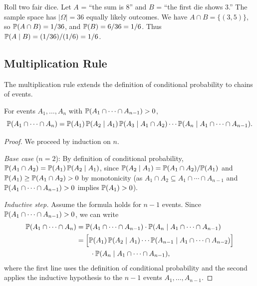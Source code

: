\documentclass[11pt,a4paper]{article}
\begin{document}
\begin{example}
\label{ex:cond_dice}
Roll two fair dice. Let $A$ = ``the sum is 8'' and $B$ = ``the first die
shows 3.'' The sample space has $|\Omega| = 36$ equally likely outcomes.
We have $A \cap B = \{(3, 5)\}$, so $\mathbb{P}(A \cap B) = 1/36$, and
$\mathbb{P}(B) = 6/36 = 1/6$. Thus
$\mathbb{P}(A \mid B) = (1/36)/(1/6) = 1/6$.
\end{example}

\subsection{Multiplication Rule}

The multiplication rule extends the definition of conditional probability
to chains of events.

\begin{theorem}
\label{thm:mult_rule}
For events $A_1, \ldots, A_n$ with
$\mathbb{P}(A_1 \cap \cdots \cap A_{n-1}) > 0$,
\[
    \mathbb{P}(A_1 \cap \cdots \cap A_n)
    = \mathbb{P}(A_1) \, \mathbb{P}(A_2 \mid A_1) \,
    \mathbb{P}(A_3 \mid A_1 \cap A_2) \cdots
    \mathbb{P}(A_n \mid A_1 \cap \cdots \cap A_{n-1}).
\]
\end{theorem}

\begin{proof}
We proceed by induction on $n$.

\emph{Base case} ($n = 2$): By definition of conditional probability,
$\mathbb{P}(A_1 \cap A_2)
= \mathbb{P}(A_1) \, \mathbb{P}(A_2 \mid A_1)$,
since $\mathbb{P}(A_2 \mid A_1) = \mathbb{P}(A_1 \cap A_2)/\mathbb{P}(A_1)$ and
$\mathbb{P}(A_1) \geq \mathbb{P}(A_1 \cap A_2) > 0$ by monotonicity (as
$A_1 \cap A_2 \subseteq A_1 \cap \cdots \cap A_{n-1}$ and
$\mathbb{P}(A_1 \cap \cdots \cap A_{n-1}) > 0$ implies
$\mathbb{P}(A_1) > 0$).

\emph{Inductive step.} Assume the formula holds for $n - 1$ events.
Since $\mathbb{P}(A_1 \cap \cdots \cap A_{n-1}) > 0$, we can write
\begin{align*}
    \mathbb{P}(A_1 \cap \cdots \cap A_n)
    &= \mathbb{P}(A_1 \cap \cdots \cap A_{n-1}) \cdot
       \mathbb{P}(A_n \mid A_1 \cap \cdots \cap A_{n-1}) \\
    &= \Bigl[\mathbb{P}(A_1) \, \mathbb{P}(A_2 \mid A_1) \cdots
       \mathbb{P}(A_{n-1} \mid A_1 \cap \cdots \cap A_{n-2})\Bigr] \\
    &\qquad \cdot \mathbb{P}(A_n \mid A_1 \cap \cdots \cap A_{n-1}),
\end{align*}
where the first line uses the definition of conditional probability and
the second applies the inductive hypothesis to the $n - 1$ events
$A_1, \ldots, A_{n-1}$.
\end{proof}
\end{document}
